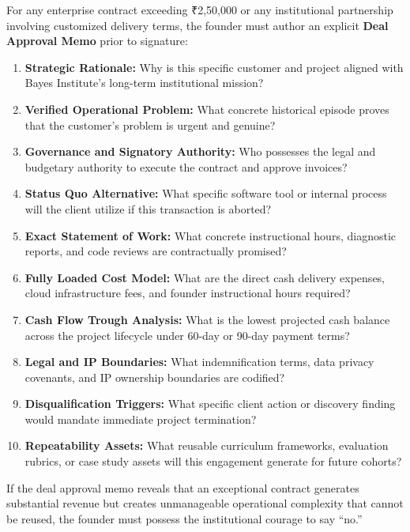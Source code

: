 For any enterprise contract exceeding ₹2,50,000 or any institutional partnership involving customized delivery terms, the founder must author an explicit \textbf{Deal Approval Memo} prior to signature:
\begin{enumerate}
\item \textbf{Strategic Rationale:} Why is this specific customer and project aligned with Bayes Institute's long-term institutional mission?
\item \textbf{Verified Operational Problem:} What concrete historical episode proves that the customer's problem is urgent and genuine?
\item \textbf{Governance and Signatory Authority:} Who possesses the legal and budgetary authority to execute the contract and approve invoices?
\item \textbf{Status Quo Alternative:} What specific software tool or internal process will the client utilize if this transaction is aborted?
\item \textbf{Exact Statement of Work:} What concrete instructional hours, diagnostic reports, and code reviews are contractually promised?
\item \textbf{Fully Loaded Cost Model:} What are the direct cash delivery expenses, cloud infrastructure fees, and founder instructional hours required?
\item \textbf{Cash Flow Trough Analysis:} What is the lowest projected cash balance across the project lifecycle under 60-day or 90-day payment terms?
\item \textbf{Legal and IP Boundaries:} What indemnification terms, data privacy covenants, and IP ownership boundaries are codified?
\item \textbf{Disqualification Triggers:} What specific client action or discovery finding would mandate immediate project termination?
\item \textbf{Repeatability Assets:} What reusable curriculum frameworks, evaluation rubrics, or case study assets will this engagement generate for future cohorts?
\end{enumerate}
If the deal approval memo reveals that an exceptional contract generates substantial revenue but creates unmanageable operational complexity that cannot be reused, the founder must possess the institutional courage to say ``no.''
